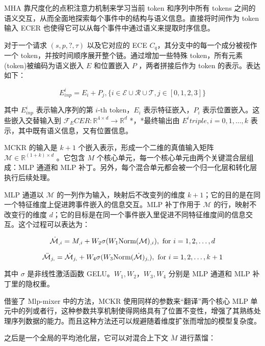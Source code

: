 \documentclass[a4paper, AutoFakeBold]{article}
\begin{document}
MHA 靠尺度化的点积注意力机制来学习当前 token 和序列中所有 tokens 之间的语义交互，从而全面地探索每个事件中的结构与语义信息。直接将时间作为 token 输入 ECER 也使得它可以从每个事件中通过语义来提取时序信息。

对于一个请求 $(s,p,?,\tau)$ 以及它对应的 ECE $C_q$，其分支中的每一个成分被视作一个 token，并按时间顺序展开整个链。通过增加一些特殊 token，所有元素(token)被编码为语义嵌入 $E$ 和位置嵌入 $P$ ，两者拼接后作为 token 的表示。表达如下：

\begin{equation}
E^i_{inp}=E_i+P_j,\{i\in{\mathcal E}\cup{\mathcal R}\cup{\mathcal T},j\in[0,1,2,3]\}
\end{equation}

其中 $E^i_{inp}$ 表示输入序列的第 $i\text{-th}$ token，$E_i$ 表示特征嵌入，$P_i$ 表示位置嵌入。这些嵌入交替输入到 ${\mathcal F}_ECER:{\mathbb R}^{4\times d}\rightarrow {\mathbb R}^d$ *，*最终输出由 $E^i{triple},i=0,1,\dots,k$ 表示，其中既有语义信息，又有位置信息。


MCKR 的输入是 $k+1$ 个嵌入表示，形成一个二维的真值输入矩阵 ${\mathcal M}\in{\mathbb R}^{(1+k)\times d}$ 。它包含 $M$ 个核心单元，每一个核心单元由两个关键混合层组成：MLP 通道和 MLP 补丁。另外，每个混合单元都会被一个归一化层和转化层执行后续处理。

MLP 通道以 ${\mathcal M}$ 的一列作为输入，映射后不改变列的维度 $k+1$；它的目的是在同一个特征维度上促进跨事件嵌入的信息交互。MLP 补丁作用于 ${\mathcal M}$ 的行，映射不改变行的维度 $d$；它的目标是在同一个事件嵌入里促进不同特征维度间的信息交互。这个过程可以表达为：

\begin{equation}
\dot{\mathcal M}_{\*,i}=M_{\*,i}+W_2\sigma(W_1\text{Norm}({\mathcal M})_{\*,i}),\ \text{for}\ i=1,2,\dots,d
\end{equation}

\begin{equation}
\ddot{\mathcal M}_{j,\*}=\dot{\mathcal M}_{j,\*}+W_4\sigma(W_3\text{Norm}(\dot{\mathcal M})_{j,\*}),\ \text{for}\ i=1,2,\dots,k+1
\end{equation}

其中 $\sigma$ 是非线性激活函数 GELU。$W_1,W_2$，$W_3,W_4$ 分别是 MLP 通道和 MLP 补丁里的隐权重。

借鉴了 Mlp-mixer 中的方法，MCKR 使用同样的参数来“翻译”两个核心 MLP 单元中的列或者行，这种参数共享机制使得网络具有了位置不变性，增强了其熟练处理序列数据的能力。而且这种方法还可以规避随着维度扩张而增加的模型复杂度。

之后是一个全局的平均池化层，它可以对混合上下文 $\ddot{M}$ 进行蒸馏：
\end{document}
